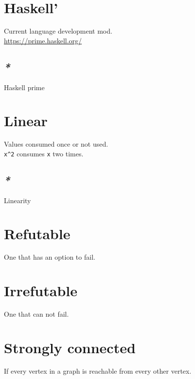 \documentclass[a4paper,14pt,oneside]{book}
\begin{document}
\chapter{\label{org0f5dfbf}Haskell'}
\label{sec:org8a02feb}
Current language development mod.\\

\url{https://prime.haskell.org/}\\

\section{\emph{*}}
\label{sec:org44450cc}

\label{orge9a2bb7}Haskell prime\\

\chapter{\label{orgdbc19f4}Linear}
\label{sec:org1b129eb}
Values consumed once or not used.\\

\texttt{x\textasciicircum{}2} consumes \texttt{x} two times.\\

\section{\emph{*}}
\label{sec:orgf2cf01a}

\label{org63e7473}Linearity\\

\chapter{\label{org9a92abc}Refutable}
\label{sec:orgce35157}
One that has an option to fail.\\

\chapter{\label{orgabbcab0}Irrefutable}
\label{sec:org47c9bd6}
One that can not fail.\\

\chapter{\label{orga79f50b}Strongly connected}
\label{sec:org1f538a0}
If every vertex in a graph is reachable from every other vertex.\\
\end{document}
